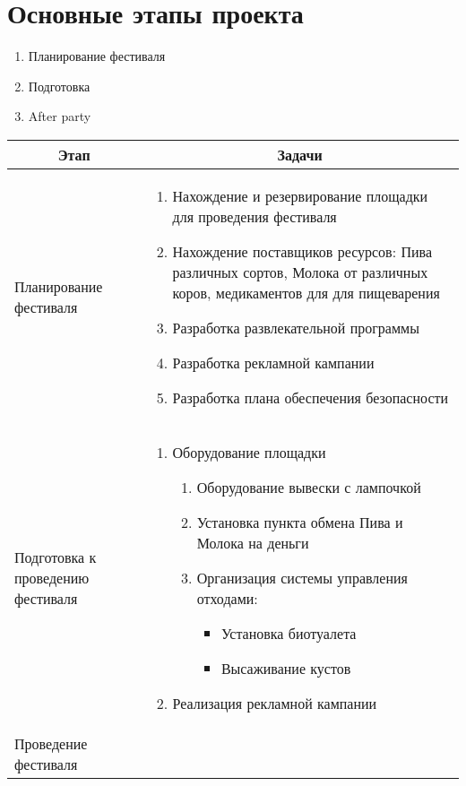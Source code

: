 \documentclass[a4paper,12pt]{article}
\begin{document}
\section{Основные этапы проекта}
\begin{enumerate}
  \item{Планирование фестиваля}
  \item{Подготовка }
  \item{After party}
\end{enumerate}
\begin{center}
\begin{longtable}{|p{3cm}|p{11cm}|}
  \hline
  \multicolumn{1}{|c|}{\textbf{Этап}} & \multicolumn{1}{|c|}{\textbf{Задачи}}\\
  \hline
  \endhead
  Планирование фестиваля & 
  \begin{enumerate}
    \item Нахождение и резервирование площадки для проведения фестиваля
    \item Нахождение поставщиков ресурсов: Пива различных сортов, Молока от различных коров, медикаментов для для пищеварения 
    \item Разработка развлекательной программы 
    \item Разработка рекламной кампании
    \item Разработка плана обеспечения безопасности
  \end{enumerate} \\
  \hline
  Подготовка к проведению фестиваля & 
  \begin{enumerate}
    \item Оборудование площадки 
      \begin{enumerate}
        \item Оборудование вывески с лампочкой
        \item Установка пункта обмена Пива и Молока на деньги 
        \item Организация системы управления отходами:
          \begin{itemize}
            \item Установка биотуалета
            \item Высаживание кустов
          \end{itemize}
      \end{enumerate}
    \item Реализация рекламной кампании
  \end{enumerate} \\
  \hline
  Проведение фестиваля &

\end{longtable}
\end{center}
\end{document}
